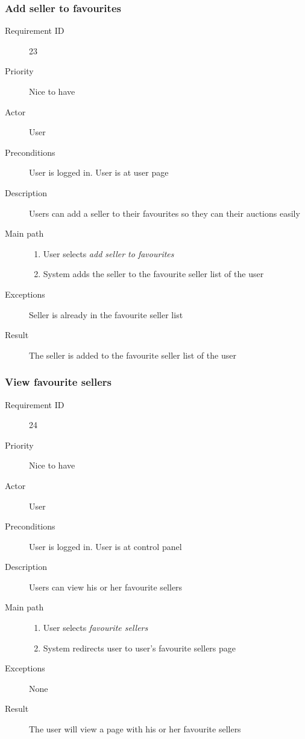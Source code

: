 		\subsubsection{Add seller to favourites}
			\begin{description}
				\item[Requirement ID] 23
				\item[Priority] Nice to have
				\item[Actor] User
				\item[Preconditions] User is logged in. User is at user page
				\item[Description] Users can add a seller to their favourites so they can their auctions easily
				\item[Main path]
 					\begin{enumerate}
						\item User selects \emph{add seller to favourites}
						\item System adds the seller to the favourite seller list of the user
					\end{enumerate}
				\item[Exceptions] Seller is already in the favourite seller list
				\item[Result] The seller is added to the favourite seller list of the user
			\end{description}
		\subsubsection{View favourite sellers}
			\begin{description}
				\item[Requirement ID] 24
				\item[Priority] Nice to have
				\item[Actor] User
				\item[Preconditions] User is logged in. User is at control panel
				\item[Description] Users can view his or her favourite sellers
				\item[Main path]
 					\begin{enumerate}
						\item User selects \emph{favourite sellers}
						\item System redirects user to user's favourite sellers page
					\end{enumerate}
				\item[Exceptions] None
				\item[Result] The user will view a page with his or her favourite sellers
			\end{description}
